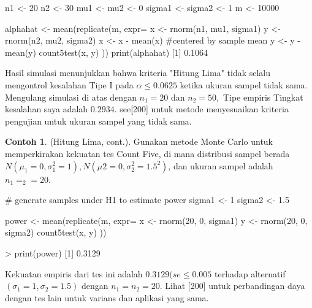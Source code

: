 \documentclass[a4paper,12pt]{article}
\theoremstyle{definition}
\newtheorem{example}{Contoh}[section]
\begin{document}
\begin{spverbatim}
    n1 <- 20
    n2 <- 30
    mu1 <- mu2 <- 0
    sigma1 <- sigma2 <- 1
    m <- 10000
    
    alphahat <- mean(replicate(m, expr={
           x <- rnorm(n1, mu1, sigma1)
           y <- rnorm(n2, mu2, sigma2)
           x <- x - mean(x) #centered by sample mean
           y <- y - mean(y)
           count5test(x, y)
           }))
    print(alphahat)
    [1] 0.1064
\end{spverbatim}
Hasil simulasi menunjukkan bahwa kriteria "Hitung Lima" tidak selalu mengontrol kesalahan Tipe I pada $\alpha \leq 0.0625$ ketika ukuran sampel tidak sama. Mengulang simulasi di atas dengan $n_{1}=20$ dan $n_{2}=50,$ Tipe empiris
Tingkat kesalahan saya adalah $0.2934$. see[200] untuk metode menyesuaikan kriteria pengujian untuk
ukuran sampel yang tidak sama.
\begin{example}
    (Hitung Lima, cont.). Gunakan metode Monte Carlo untuk memperkirakan kekuatan tes Count Five, di mana distribusi sampel berada $N(\mu _{1}=0,\sigma ^{2}_{1}=1), N(\mu 2=0,\sigma^{2}_{2}=1.5^{2})$, dan ukuran sampel adalah $n_{1}=_{2}=20$.
\end{example}
\begin{spverbatim}
    # generate samples under H1 to estimate power
    sigma1 <- 1
    sigma2 <- 1.5
    
    power  <- mean(replicate(m, expr={
         x <- rnorm(20, 0, sigma1)
         y <- rnorm(20, 0, sigma2)
         count5test(x, y)
         }))
    
    > print(power)
    [1] 0.3129
\end{spverbatim}
Kekuatan empiris dari tes ini adalah $0.3129(se\leq0.005$ terhadap alternatif $(\sigma _{1}=1, \sigma _{2}=1.5)$ dengan $n_{1}=n_{2}=20$. Lihat [200] untuk perbandingan daya dengan tes lain untuk varians dan aplikasi yang sama.
\end{document}
